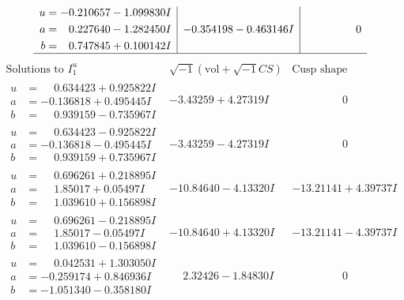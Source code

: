 \documentclass[1p]{elsarticle_modified}
\theoremstyle{definition}
\newcommand{\I}{\sqrt{-1}}
\begin{document}
$$\begin{array}{c|c|c}
\begin{aligned}
u &= -0.210657 - 1.099830 I \\
a &= \phantom{-}0.227640 - 1.282450 I \\
b &= \phantom{-}0.747845 + 0.100142 I\end{aligned}
 & -0.354198 - 0.463146 I & \phantom{-0.000000 } 0\\
 \hline 
 \end{array}$$\newpage$$\begin{array}{c|c|c}  
\text{Solutions to }I^u_{1}& \I (\text{vol} + \sqrt{-1}CS) & \text{Cusp shape}\\
 \hline 
\begin{aligned}
u &= \phantom{-}0.634423 + 0.925822 I \\
a &= -0.136818 + 0.495445 I \\
b &= \phantom{-}0.939159 - 0.735967 I\end{aligned}
 & -3.43259 + 4.27319 I & \phantom{-0.000000 } 0 \\ \hline\begin{aligned}
u &= \phantom{-}0.634423 - 0.925822 I \\
a &= -0.136818 - 0.495445 I \\
b &= \phantom{-}0.939159 + 0.735967 I\end{aligned}
 & -3.43259 - 4.27319 I & \phantom{-0.000000 } 0 \\ \hline\begin{aligned}
u &= \phantom{-}0.696261 + 0.218895 I \\
a &= \phantom{-}1.85017 + 0.05497 I \\
b &= \phantom{-}1.039610 + 0.156898 I\end{aligned}
 & -10.84640 - 4.13320 I & -13.21141 + 4.39737 I \\ \hline\begin{aligned}
u &= \phantom{-}0.696261 - 0.218895 I \\
a &= \phantom{-}1.85017 - 0.05497 I \\
b &= \phantom{-}1.039610 - 0.156898 I\end{aligned}
 & -10.84640 + 4.13320 I & -13.21141 - 4.39737 I \\ \hline\begin{aligned}
u &= \phantom{-}0.042531 + 1.303050 I \\
a &= -0.259174 + 0.846936 I \\
b &= -1.051340 - 0.358180 I\end{aligned}
 & \phantom{-}2.32426 - 1.84830 I & \phantom{-0.000000 } 0 \\ \hline\begin{aligned}

\end{aligned}
\end{array}$$
\end{document}
